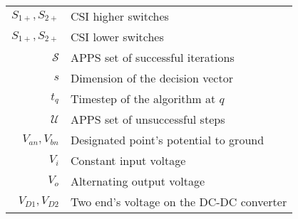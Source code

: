 \begin{scriptsize}
\begin{tabularx}{\textwidth}{r|X}
$S_{1+},S_{2+}$										& CSI higher switches\\
$S_{1+},S_{2+}$										& CSI lower switches\\
$\mathcal{S}$                   & APPS set of successful iterations\\
$s$                             & Dimension of the decision vector\\
$t_q$                             & Timestep of the algorithm at $q$\\
$\mathcal{U}$              & APPS set of unsuccessful steps\\
$V_{an},V_{bn}$  									& Designated point's potential to ground \\
$V_i$															& Constant input voltage\\
$V_o$															& Alternating output voltage\\
$V_{D1},V_{D2}$ 									& Two end's voltage on the DC-DC converter\\

\end{tabularx}
\end{scriptsize}
